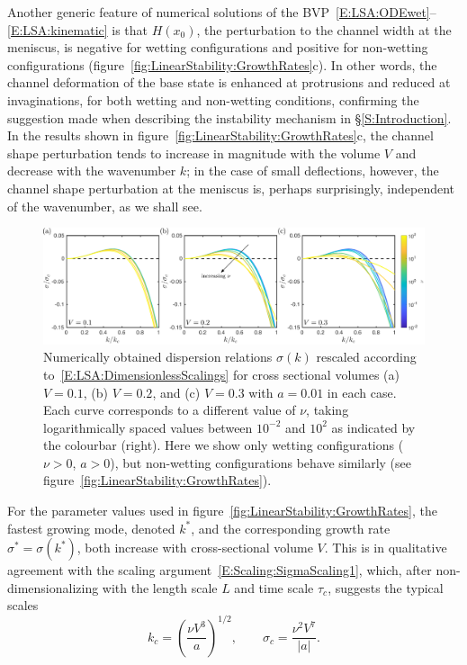 \documentclass{jfm}
\newcommand{\aspect}{a} %
\begin{document}
Another generic feature of numerical solutions of the BVP~\eqref{E:LSA:ODEwet}--\eqref{E:LSA:kinematic} is that $H(x_0)$, the perturbation to the channel width at the meniscus, is negative for wetting configurations and positive for non-wetting configurations (figure~\ref{fig:LinearStability:GrowthRates}c). In other words, the channel deformation of the base state is enhanced at protrusions and reduced at invaginations, for both wetting and non-wetting conditions, confirming the suggestion made when describing the instability mechanism in \S\ref{S:Introduction}. In the results shown in figure~\ref{fig:LinearStability:GrowthRates}c, the channel shape perturbation tends to increase in magnitude with the volume $V$ and decrease with the wavenumber $k$; in the case of small deflections, however, the channel shape perturbation at the meniscus is, perhaps surprisingly, independent of the wavenumber, as we shall see. 

\begin{figure}
\centering
\includegraphics[width = \textwidth]{figures/fig7_rescaled_growth_rates.pdf}
\caption{Numerically obtained dispersion relations $\sigma(k)$ rescaled according to~\eqref{E:LSA:DimensionlessScalings} for cross sectional volumes (a) $V = 0.1$, (b) $V = 0.2$, and (c) $V = 0.3$ with $\aspect = 0.01$ in each case. Each curve corresponds to a different value of $\nu$, taking logarithmically spaced values between $10^{-2}$ and $10^{2}$ as indicated by the colourbar (right). Here we show only wetting configurations ($\nu >0$, $a >0$), but non-wetting configurations behave similarly (see figure~\ref{fig:LinearStability:GrowthRates}). }
\label{fig:RescaledGrowthRates}
\end{figure}

For the parameter values used in figure~\ref{fig:LinearStability:GrowthRates}, the fastest growing mode, denoted $k^*$, and the corresponding growth rate $\sigma^* = \sigma(k^*)$, both increase with cross-sectional volume $V$. This is in qualitative agreement with the scaling argument~\eqref{E:Scaling:SigmaScaling1}, which, after non-dimensionalizing with the length scale $L$ and time scale $\tau_c$, suggests the typical scales
\begin{equation}\label{E:LSA:DimensionlessScalings}
k_c  = \left(\frac{\nu V^3}{a}\right)^{1/2}, \qquad \sigma_c = \frac{\nu^2 V^7}{|a|}.
\end{equation}
\end{document}
